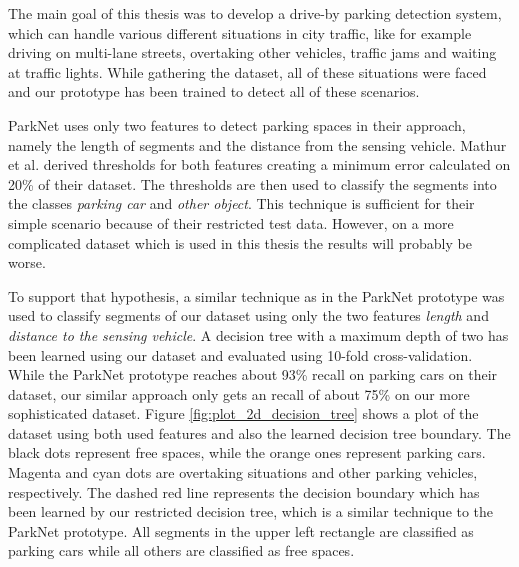 The main goal of this thesis was to develop a drive-by parking detection system, which can handle various different situations in city traffic, like for example driving on multi-lane streets, overtaking other vehicles, traffic jams and waiting at traffic lights. While gathering the dataset, all of these situations were faced and our prototype has been trained to detect all of these scenarios.

ParkNet uses only two features to detect parking spaces in their approach, namely the length of segments and the distance from the sensing vehicle. Mathur et al. derived thresholds for both features creating a minimum error calculated on 20\% of their dataset. The thresholds are then used to classify the segments into the classes \emph{parking car} and \emph{other object}. This technique is sufficient for their simple scenario because of their restricted test data. However, on a more complicated dataset which is used in this thesis the results will probably be worse.

To support that hypothesis, a similar technique as in the ParkNet prototype was used to classify segments of our dataset using only the two features \emph{length} and \emph{distance to the sensing vehicle}. A decision tree with a maximum depth of two has been learned using our dataset and evaluated using 10-fold cross-validation. While the ParkNet prototype reaches about  93\% recall on parking cars on their dataset, our similar approach only gets an recall of about 75\% on our more sophisticated dataset. Figure \ref{fig:plot_2d_decision_tree} shows a plot of the dataset using both used features and also the learned decision tree boundary. The black dots represent free spaces, while the orange ones represent parking cars. Magenta and cyan dots are overtaking situations and other parking vehicles, respectively. The dashed red line represents the decision boundary which has been learned by our restricted decision tree, which is a similar technique to the ParkNet prototype. All segments in the upper left rectangle are classified as parking cars while all others are classified as free spaces.

